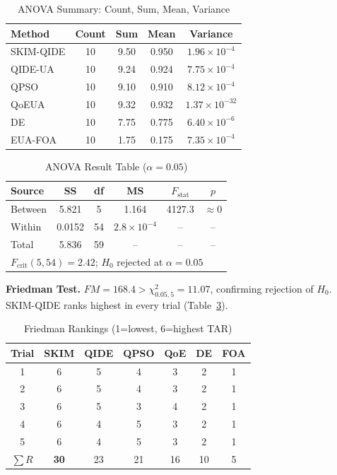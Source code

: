\documentclass[10pt,twocolumn]{article}
\begin{document}
\begin{table}[t]
\centering\caption{ANOVA Summary: Count, Sum, Mean, Variance}\label{tab:anova_sum}
\small\renewcommand{\arraystretch}{1.2}
\begin{tabular}{|l|c|c|c|c|}
\hline
Method & Count & Sum & Mean & Variance\\\hline
SKIM-QIDE & 10 & 9.50 & 0.950 & $1.96\!\times\!10^{-4}$\\\hline
QIDE-UA   & 10 & 9.24 & 0.924 & $7.75\!\times\!10^{-4}$\\\hline
QPSO      & 10 & 9.10 & 0.910 & $8.12\!\times\!10^{-4}$\\\hline
QoEUA     & 10 & 9.32 & 0.932 & $1.37\!\times\!10^{-32}$\\\hline
DE        & 10 & 7.75 & 0.775 & $6.40\!\times\!10^{-6}$\\\hline
EUA-FOA   & 10 & 1.75 & 0.175 & $7.35\!\times\!10^{-4}$\\\hline
\end{tabular}
\end{table}

\begin{table}[t]
\centering\caption{ANOVA Result Table ($\alpha=0.05$)}\label{tab:anova_res}
\small\renewcommand{\arraystretch}{1.2}
\begin{tabular}{|l|c|c|c|c|c|}
\hline
Source & SS & df & MS & $F_{\mathrm{stat}}$ & $p$\\\hline
Between & 5.821 & 5 & 1.164 & 4127.3 & $\approx\!0$\\\hline
Within  & 0.0152 & 54 & $2.8\!\times\!10^{-4}$ & -- & --\\\hline
Total   & 5.836 & 59 & -- & -- & --\\\hline
\multicolumn{6}{|l|}{$F_{\mathrm{crit}}(5,54)=2.42$;\; $H_0$ rejected at $\alpha=0.05$}\\\hline
\end{tabular}
\end{table}

\textbf{Friedman Test.} $FM=168.4>\chi^2_{0.05,5}=11.07$, confirming rejection of $H_0$. SKIM-QIDE ranks highest in every trial (Table~\ref{tab:friedman}).

\begin{table}[t]
\centering\caption{Friedman Rankings (1=lowest, 6=highest TAR)}\label{tab:friedman}
\small\renewcommand{\arraystretch}{1.2}
\begin{tabular}{|c|c|c|c|c|c|c|}
\hline
Trial & SKIM & QIDE & QPSO & QoE & DE & FOA\\\hline
1 & 6 & 5 & 4 & 3 & 2 & 1\\\hline
2 & 6 & 5 & 4 & 3 & 2 & 1\\\hline
3 & 6 & 5 & 3 & 4 & 2 & 1\\\hline
4 & 6 & 4 & 5 & 3 & 2 & 1\\\hline
5 & 6 & 4 & 5 & 3 & 2 & 1\\\hline
$\sum R$ & \textbf{30} & 23 & 21 & 16 & 10 & 5\\\hline
\end{tabular}
\end{table}
\end{document}
